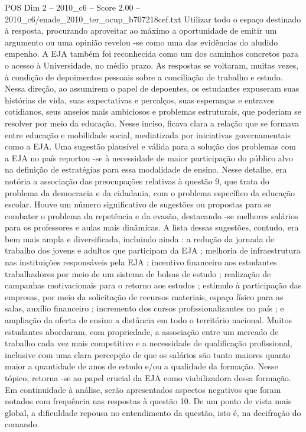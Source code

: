 \begin{textsample}{POS Dim 2 – 2010\_c6 – Score 2.00 – 2010\_c6/enade\_2010\_ter\_ocup\_b707218cef.txt}
Utilizar todo o espaço destinado à resposta, procurando aproveitar ao máximo a oportunidade de emitir um argumento ou uma opinião revelou -se como uma das evidências do aludido empenho.
A EJA também foi reconhecida como um dos caminhos concretos para o acesso à Universidade, no médio prazo.
As respostas se voltaram, muitas vezes, à condição de depoimentos pessoais sobre a conciliação de trabalho e estudo.
Nessa direção, ao assumirem o papel de depoentes, os estudantes expuseram suas histórias de vida, suas expectativas e percalços, suas esperanças e entraves cotidianos, seus anseios mais ambiciosos e problemas estruturais, que poderiam se resolver por meio da educação.
Nesse inciso, ficava clara a relação que se formava entre educação e mobilidade social, mediatizada por iniciativas governamentais como a EJA.
Uma sugestão plausível e válida para a solução dos problemas com a EJA no país reportou -se à necessidade de maior participação do público alvo na definição de estratégias para essa modalidade de ensino.
Nesse detalhe, era notória a associação das preocupações relativas à questão 9, que trata do problema da democracia e da cidadania, com o problema específico da educação escolar.
Houve um número significativo de sugestões ou propostas para se combater o problema da repetência e da evasão, destacando -se melhores salários para os professores e aulas mais dinâmicas.
A lista dessas sugestões, contudo, era bem mais ampla e diversificada, incluindo ainda : a redução da jornada de trabalho dos jovens e adultos que participam da EJA ; melhoria de infraestrutura nas instituições responsáveis pela EJA ; incentivo financeiro aos estudantes trabalhadores por meio de um sistema de bolsas de estudo ; realização de campanhas motivacionais para o retorno aos estudos ; estímulo à participação das empresas, por meio da solicitação de recursos materiais, espaço físico para as salas, auxílio financeiro ; incremento dos cursos profissionalizantes no país ; e ampliação da oferta de ensino a distância em todo o território nacional.
Muitos estudantes abordaram, com propriedade, a associação entre um mercado de trabalho cada vez mais competitivo e a necessidade de qualificação profissional, inclusive com uma clara percepção de que os salários são tanto maiores quanto maior a quantidade de anos de estudo e/ou a qualidade da formação.
Nesse tópico, retorna -se ao papel crucial da EJA como viabilizadora dessa formação.
Em continuidade à análise, serão apresentados aspectos negativos que foram notados com frequência nas respostas à questão 10.
De um ponto de vista mais global, a dificuldade repousa no entendimento da questão, isto é, na decifração do comando.

\end{textsample}
